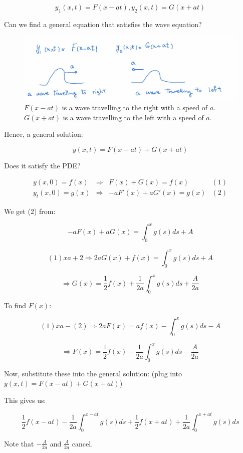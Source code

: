 $$y_1 (x,t) = F(x-at), y_2(x,t) = G(x+at)$$

Can we find a general equation that satisfies the wave equation?


\begin{figure}[ht]
    \centering
    \includegraphics[width = 0.9 \textwidth]{image1.png}
    \caption{$F(x-at)$ is a wave travelling to the right with a speed of $a$. $G(x+at)$ is a wave travelling to the left with a speed of $a$. }
    \label{fig:Wave_directions}
\end{figure}

Hence, a general solution:

$$y(x,t) = F(x-at) + G(x+at)$$

Does it satisfy the PDE?

$$\begin{matrix} y(x,0) = f(x) & \Rightarrow & F(x) + G(x) = f(x) & (1)\\ y_t(x,0) = g(x) & \Rightarrow & -a F'(x) + a G'(x) = g(x) & (2) \end{matrix}$$

We get (2) from:

$$-a F(x) + a G(x) = \int_0^x g(s) ds + A$$

$$(1) xa + 2 \Rightarrow 2aG(x) + f(x) = \int_0^x g(s) ds + A$$

$$\Rightarrow G(x) = \frac{1}{2} f(x) + \frac{1}{2a} \int_0^x g(s) ds + \frac{A}{2a}$$

To find $F(x)$:

$$(1) xa - (2) \Rightarrow 2a F(x) = a f(x) - \int_0^x g(s) ds - A$$

$$\Rightarrow F(x) = \frac{1}{2} f(x) - \frac{1}{2a} \int_0^x g(s) ds - \frac{A}{2a}$$

Now, substitute these into the general solution: (plug into $y(x,t) = F(x-at) + G(x+at)$)

This gives us:

$$\frac{1}{2} f(x-at) - \frac{1}{2a} \int_0^{x-at} g(s) ds + \frac{1}{2} f(x+at) + \frac{1}{2a} \int_0^{x+at} g(s) ds$$

Note that $- \frac{A}{2a}$ and $\frac{A}{2a}$ cancel. 

